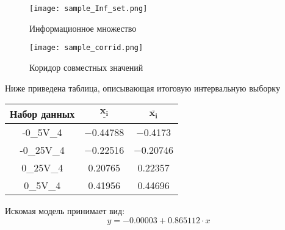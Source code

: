 \documentclass[12pt,a4paper]{article}
\begin{document}
        \begin{figure}[h!]
            \centering
            \texttt{[image: sample\_Inf\_set.png]}
            \caption{Информационное множество}
        \end{figure}

        \begin{figure}[h!]
            \centering
            \texttt{[image: sample\_corrid.png]}
            \caption{Коридор совместных значений}
        \end{figure}
        \FloatBarrier
        
       Ниже приведена таблица, описывающая итоговую интервальную выборку
        \begin{center}
            \begin{tabular}{|c|c|c|}
            \hline
                \textbf{Набор данных} & $\mathbf{\underline{x_i}}$ & $\mathbf{\overline{x_i}}$\\
                \hline
                -0\_5V\_4&−0.44788&−0.4173\\
                \hline
                -0\_25V\_4&−0.22516&−0.20746\\
                \hline
                0\_25V\_4&0.20765&0.22357\\
                \hline
                0\_5V\_4&0.41956&0.44696\\
                \hline
            \end{tabular}
        \end{center}
      
        Искомая модель принимает вид:
        \begin{equation}
            y = -0.00003 + 0.865112 \cdot x
        \end{equation}
        
        \clearpage
	\newpage
\end{document}

